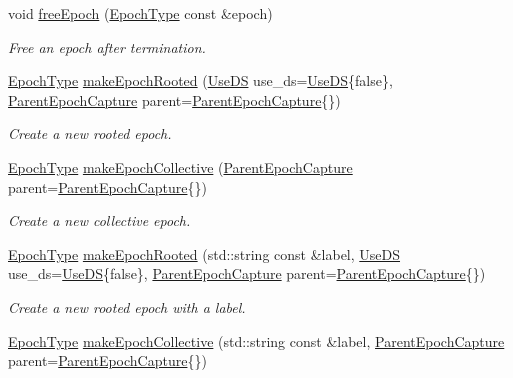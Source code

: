 \begin{DoxyCompactItemize}
void \hyperlink{structvt_1_1term_1_1_termination_detector_a3b1e4a0d87c5af08fc36925ec74504fd}{free\+Epoch} (\hyperlink{namespacevt_a985a5adf291c34a3ca263b3378388236}{Epoch\+Type} const \&epoch)
\begin{DoxyCompactList}\small\item\em Free an epoch after termination. \end{DoxyCompactList}\item 
\hyperlink{namespacevt_a985a5adf291c34a3ca263b3378388236}{Epoch\+Type} \hyperlink{structvt_1_1term_1_1_termination_detector_ae4df2a2e947665cc89971a61de787a98}{make\+Epoch\+Rooted} (\hyperlink{structvt_1_1term_1_1_use_d_s}{Use\+DS} use\+\_\+ds=\hyperlink{structvt_1_1term_1_1_use_d_s}{Use\+DS}\{false\}, \hyperlink{structvt_1_1term_1_1_parent_epoch_capture}{Parent\+Epoch\+Capture} parent=\hyperlink{structvt_1_1term_1_1_parent_epoch_capture}{Parent\+Epoch\+Capture}\{\})
\begin{DoxyCompactList}\small\item\em Create a new rooted epoch. \end{DoxyCompactList}\item 
\hyperlink{namespacevt_a985a5adf291c34a3ca263b3378388236}{Epoch\+Type} \hyperlink{structvt_1_1term_1_1_termination_detector_aeba62165ec8dfbc445e3631ff295f159}{make\+Epoch\+Collective} (\hyperlink{structvt_1_1term_1_1_parent_epoch_capture}{Parent\+Epoch\+Capture} parent=\hyperlink{structvt_1_1term_1_1_parent_epoch_capture}{Parent\+Epoch\+Capture}\{\})
\begin{DoxyCompactList}\small\item\em Create a new collective epoch. \end{DoxyCompactList}\item 
\hyperlink{namespacevt_a985a5adf291c34a3ca263b3378388236}{Epoch\+Type} \hyperlink{structvt_1_1term_1_1_termination_detector_ac7e27dfc37a7a4cb1e1538f4f9eac4c6}{make\+Epoch\+Rooted} (std\+::string const \&label, \hyperlink{structvt_1_1term_1_1_use_d_s}{Use\+DS} use\+\_\+ds=\hyperlink{structvt_1_1term_1_1_use_d_s}{Use\+DS}\{false\}, \hyperlink{structvt_1_1term_1_1_parent_epoch_capture}{Parent\+Epoch\+Capture} parent=\hyperlink{structvt_1_1term_1_1_parent_epoch_capture}{Parent\+Epoch\+Capture}\{\})
\begin{DoxyCompactList}\small\item\em Create a new rooted epoch with a label. \end{DoxyCompactList}\item 
\hyperlink{namespacevt_a985a5adf291c34a3ca263b3378388236}{Epoch\+Type} \hyperlink{structvt_1_1term_1_1_termination_detector_a9da0ae37a148a0f6db83488cd44c19cb}{make\+Epoch\+Collective} (std\+::string const \&label, \hyperlink{structvt_1_1term_1_1_parent_epoch_capture}{Parent\+Epoch\+Capture} parent=\hyperlink{structvt_1_1term_1_1_parent_epoch_capture}{Parent\+Epoch\+Capture}\{\})

\end{DoxyCompactItemize}
